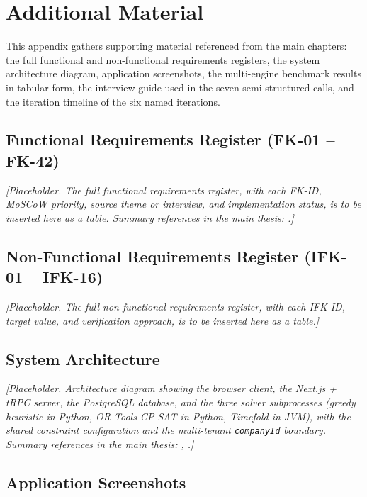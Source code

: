 \chapter{Additional Material}
\label{chap:appendix}

This appendix gathers supporting material referenced from the main chapters: the full functional and non-functional requirements registers, the system architecture diagram, application screenshots, the multi-engine benchmark results in tabular form, the interview guide used in the seven semi-structured calls, and the iteration timeline of the six named iterations.


\section{Functional Requirements Register (FK-01 -- FK-42)}
\label{app:requirements-functional}

\textit{[Placeholder. The full functional requirements register, with each FK-ID, MoSCoW priority, source theme or interview, and implementation status, is to be inserted here as a table. Summary references in the main thesis: .]}


\section{Non-Functional Requirements Register (IFK-01 -- IFK-16)}
\label{app:requirements-nonfunctional}

\textit{[Placeholder. The full non-functional requirements register, with each IFK-ID, target value, and verification approach, is to be inserted here as a table.]}


\section{System Architecture}
\label{app:architecture}

\textit{[Placeholder. Architecture diagram showing the browser client, the Next.js + tRPC server, the PostgreSQL database, and the three solver subprocesses (greedy heuristic in Python, OR-Tools CP-SAT in Python, Timefold in JVM), with the shared constraint configuration and the multi-tenant \texttt{companyId} boundary. Summary references in the main thesis: , .]}


\section{Application Screenshots}
\label{app:screenshots}

